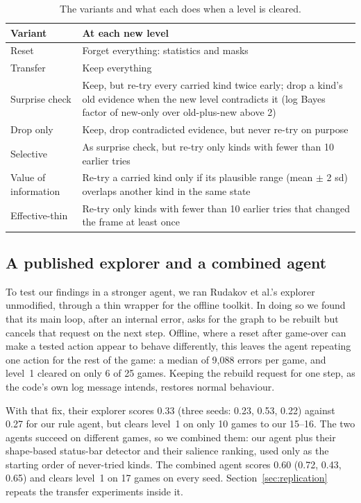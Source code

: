 \documentclass[11pt,a4paper]{article}
\begin{document}
\begin{table}[ht]
\centering
\caption{The variants and what each does when a level is cleared.}
\label{tab:variants}
\small
\begin{tabularx}{\textwidth}{@{}lX@{}}
\toprule
Variant & At each new level \\
\midrule
Reset & Forget everything: statistics and masks \\
Transfer & Keep everything \\
Surprise check & Keep, but re-try every carried kind twice early; drop a kind's old evidence when the new level contradicts it (log Bayes factor of new-only over old-plus-new above 2) \\
Drop only & Keep, drop contradicted evidence, but never re-try on purpose \\
Selective & As surprise check, but re-try only kinds with fewer than 10 earlier tries \\
Value of information & Re-try a carried kind only if its plausible range (mean $\pm$ 2 sd) overlaps another kind in the same state \\
Effective-thin & Re-try only kinds with fewer than 10 earlier tries that changed the frame at least once \\
\bottomrule
\end{tabularx}
\end{table}

\subsection{A published explorer and a combined agent}
\label{sec:combined}

To test our findings in a stronger agent, we ran Rudakov et al.'s explorer unmodified, through a thin wrapper for the offline toolkit. In doing so we found that its main loop, after an internal error, asks for the graph to be rebuilt but cancels that request on the next step. Offline, where a reset after game-over can make a tested action appear to behave differently, this leaves the agent repeating one action for the rest of the game: a median of 9,088 errors per game, and level~1 cleared on only 6 of 25 games. Keeping the rebuild request for one step, as the code's own log message intends, restores normal behaviour.

With that fix, their explorer scores 0.33 (three seeds: 0.23, 0.53, 0.22) against 0.27 for our rule agent, but clears level~1 on only 10 games to our 15--16. The two agents succeed on different games, so we combined them: our agent plus their shape-based status-bar detector and their salience ranking, used only as the starting order of never-tried kinds. The combined agent scores 0.60 (0.72, 0.43, 0.65) and clears level~1 on 17 games on every seed. Section~\ref{sec:replication} repeats the transfer experiments inside it.
\end{document}
